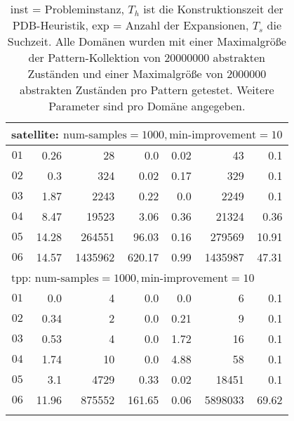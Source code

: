 \begin{longtable}{|c||r|r|r||r|r|r|}
\multicolumn{7}{|l|}{satellite: $\text{num-samples}=1000,\text{min-improvement}=10$}\\\hline
$01$ & 0.26 & 28 & 0.0 & 0.02 & 43 & 0.1 \\\hline
$02$ & 0.3 & 324 & 0.02 & 0.17 & 329 & 0.1 \\\hline
$03$ & 1.87 & 2243 & 0.22 & 0.0 & 2249 & 0.1 \\\hline
$04$ & 8.47 & 19523 & 3.06 & 0.36 & 21324 & 0.36 \\\hline
$05$ & 14.28 & 264551 & 96.03 & 0.16 & 279569 & 10.91 \\\hline
$06$ & 14.57 & 1435962 & 620.17 & 0.99 & 1435987 & 47.31 \\\hline

\multicolumn{7}{|l|}{tpp: $\text{num-samples}=1000,\text{min-improvement}=10$}\\\hline
$01$ & 0.0 & 4 & 0.0 & 0.0 & 6 & 0.1 \\\hline
$02$ & 0.34 & 2 & 0.0 & 0.21 & 9 & 0.1 \\\hline
$03$ & 0.53 & 4 & 0.0 & 1.72 & 16 & 0.1 \\\hline
$04$ & 1.74 & 10 & 0.0 & 4.88 & 58 & 0.1 \\\hline
$05$ & 3.1 & 4729 & 0.33 & 0.02 & 18451 & 0.1 \\\hline
$06$ & 11.96 & 875552 & 161.65 & 0.06 & 5898033 & 69.62 \\\hline

\caption{inst = Probleminstanz, $T_h$ ist die Konstruktionszeit der PDB-Heuristik, exp = Anzahl der Expansionen, $T_s$
die Suchzeit. Alle Domänen wurden mit einer Maximalgröße der Pattern-Kollektion von $20000000$ abstrakten Zuständen und 
einer Maximalgröße von $2000000$ abstrakten Zuständen pro Pattern getestet. Weitere Parameter sind pro Domäne angegeben.}
\end{longtable}